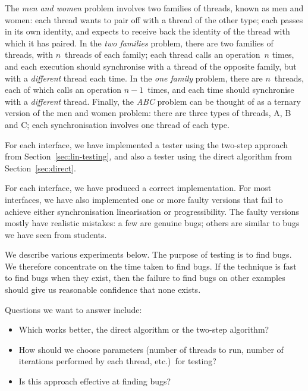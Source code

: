 
%
The \emph{men and women} problem involves two families of threads, known as
men and women: each thread wants to pair off with a thread of the other type;
each passes in its own identity, and expects to receive back the identity of
the thread with which it has paired.  
%
In the \emph{two families} problem, there are two families of threads, with
$n$~threads of each family; each thread calls an operation~$n$ times, and each
execution should synchronise with a thread of the opposite family, but with a
\emph{different} thread each time.  In the \emph{one family} problem, there
are $n$~threads, each of which calls an operation $n-1$~times, and each time
should synchronise with a \emph{different} thread.
%
Finally, the \emph{ABC} problem can be thought of as a ternary version of the
men and women problem: there are three types of threads, A, B and C; each
synchronisation involves one thread of each type.
%

For each interface, we have implemented a tester using the two-step approach
from Section~\ref{sec:lin-testing}, and also a tester using the direct
algorithm from Section~\ref{sec:direct}.

For each interface, we have produced a correct implementation.  For most
interfaces, we have also implemented one or more faulty versions that fail to
achieve either synchronisation linearisation or progressibility.  The faulty
versions mostly have realistic mistakes: a few are genuine bugs; others are
similar to bugs we have seen from students.



We describe various experiments below.  The purpose of testing is to find
bugs.  We therefore concentrate on the time taken to find bugs.  If the
technique is fast to find bugs when they exist, then the failure to find bugs
on other examples should give us reasonable confidence that none exists.

Questions we want to answer include:
\begin{itemize}
\item Which works better, the direct algorithm or the two-step algorithm?  
\item How should we choose parameters (number of threads to run, number of
  iterations performed by each thread, etc.)\ for testing?  
\item Is this approach effective at finding bugs?
\end{itemize}


